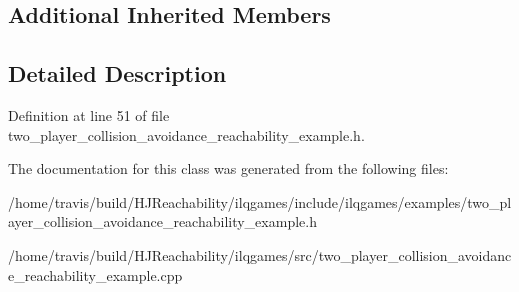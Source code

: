 \subsection*{Additional Inherited Members}


\subsection{Detailed Description}


Definition at line 51 of file two\+\_\+player\+\_\+collision\+\_\+avoidance\+\_\+reachability\+\_\+example.\+h.



The documentation for this class was generated from the following files\+:\begin{DoxyCompactItemize}
\item 
/home/travis/build/\+H\+J\+Reachability/ilqgames/include/ilqgames/examples/two\+\_\+player\+\_\+collision\+\_\+avoidance\+\_\+reachability\+\_\+example.\+h\item 
/home/travis/build/\+H\+J\+Reachability/ilqgames/src/two\+\_\+player\+\_\+collision\+\_\+avoidance\+\_\+reachability\+\_\+example.\+cpp\end{DoxyCompactItemize}
